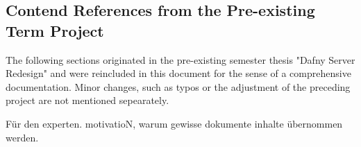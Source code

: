 \subsection{Contend References from the Pre-existing Term Project}
The following sections originated in the pre-existing semester thesis "Dafny Server Redesign"\cite{sa} and were reincluded in this document for the sense of a comprehensive documentation. Minor changes, such as typos or the adjustment of the preceding project are not mentioned sepearately.


Für den experten.
motivatioN, warum gewisse dokumente inhalte übernommen werden.

